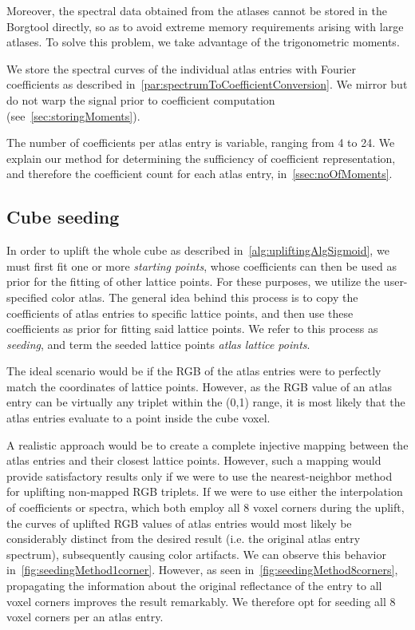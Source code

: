 Moreover, the spectral data obtained from the atlases cannot be stored in the Borgtool directly, so as to avoid extreme memory requirements arising with large atlases. To solve this problem, we take advantage of the trigonometric moments.

We store the spectral curves of the individual atlas entries with Fourier coefficients as described in~\cref{par:spectrumToCoefficientConversion}. We mirror but do not warp the signal prior to coefficient computation (see~\cref{sec:storingMoments}).

The number of coefficients per atlas entry is variable, ranging from 4 to 24. We explain our method for determining the sufficiency of coefficient representation, and therefore the coefficient count for each atlas entry, in~\cref{ssec:noOfMoments}.

\subsection{Cube seeding} 

In order to uplift the whole cube as described in~\cref{alg:upliftingAlgSigmoid}, we must first fit one or more \emph{starting points}, whose coefficients can then be used as prior for the fitting of other lattice points. For these purposes, we utilize the user-specified color atlas. The general idea behind this process is to copy the coefficients of atlas entries to specific lattice points, and then use these coefficients as prior for fitting said lattice points. We refer to this process as \emph{seeding}, and term the seeded lattice points \emph{atlas lattice points}.

The ideal scenario would be if the RGB of the atlas entries were to perfectly match the coordinates of lattice points. However, as the RGB value of an atlas entry can be virtually any triplet within the (0,1) range, it is most likely that the atlas entries evaluate to a point inside the cube voxel.

A realistic approach would be to create a complete injective mapping between the atlas entries and their closest lattice points. However, such a mapping would provide satisfactory results only if we were to use the nearest-neighbor method for uplifting non-mapped RGB triplets. If we were to use either the interpolation of coefficients or spectra, which both employ all 8 voxel corners during the uplift, the curves of uplifted RGB values of atlas entries would most likely be considerably distinct from the desired result (i.e. the original atlas entry spectrum), subsequently causing color artifacts. We can observe this behavior in~\cref{fig:seedingMethod1corner}. However, as seen in~\cref{fig:seedingMethod8corners}, propagating the information about the original reflectance of the entry to all voxel corners improves the result remarkably. We therefore opt for seeding all 8 voxel corners per an atlas entry.

